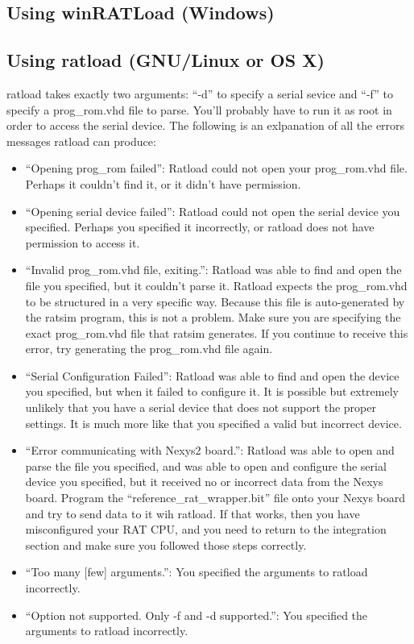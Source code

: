 \documentclass[notitlepage]{article}
\begin{document}
\subsection{Using winRATLoad (Windows)}

\subsection{Using ratload (GNU/Linux or OS X)}
ratload takes exactly two arguments: ``-d'' to specify a serial sevice and ``-f'' to specify a prog\_rom.vhd file to parse. You'll probably have to run it as root in order to access the serial device. The following is an exlpanation of all the errors messages ratload can produce:
\begin{itemize}
\item ``Opening prog\_rom failed'': Ratload could not open your prog\_rom.vhd file. Perhaps it couldn't find it, or it didn't have permission.
\item ``Opening serial device failed'': Ratload could not open the serial device you specified. Perhaps you specified it incorrectly, or ratload does not have permission to access it.
\item ``Invalid prog\_rom.vhd file, exiting.'': Ratload was able to find and open the file you specified, but it couldn't parse it. Ratload expects the prog\_rom.vhd to be structured in a very specific way. Because this file is auto-generated by the ratsim program, this is not a problem. Make sure you are specifying the exact prog\_rom.vhd file that ratsim generates. If you continue to receive this error, try generating the prog\_rom.vhd file again.
\item ``Serial Configuration Failed'': Ratload was able to find and open the device you specified, but when it failed to configure it. It is possible but extremely unlikely that you have a serial device that does not support the proper settings. It is much more like that you specified a valid but incorrect device.
\item ``Error communicating with Nexys2 board.'': Ratload was able to open and parse the file you specified, and was able to open and configure the serial device you specified, but it received no or incorrect data from the Nexys board. Program the ``reference\_rat\_wrapper.bit'' file onto your Nexys board and try to send data to it wih ratload. If that works, then you have misconfigured your RAT CPU, and you need to return to the integration section and make sure you followed those steps correctly. 
\item ``Too many [few] arguments.'': You specified the arguments to ratload incorrectly.
\item ``Option not supported. Only -f and -d supported.'': You specified the arguments to ratload incorrectly.
\end{itemize}
\end{document}
